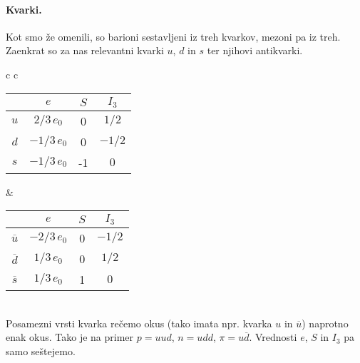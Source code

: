 \documentclass[a4paper]{article}
\begin{document}
\paragraph{Kvarki.} Kot smo že omenili, so barioni sestavljeni iz treh kvarkov, mezoni pa iz treh.
Zaenkrat so za nas relevantni kvarki \(u\), \(d\) in \(s\) ter njihovi antikvarki.
\begin{table}[h!]
    \centering
    \begin{tabular}{c c}
        \begin{tabular}{c|c c c}
            & \(e\) & \(S\) & \(I_3\) \\
            \hline
            \(u\) & \(2/3\,e_0\) & 0 & \(1/2\) \\
            \(d\) & \(-1/3\,e_0\) & 0 & \(-1/2\) \\
            \(s\) & \(-1/3\,e_0\) & -1 & \(0\) \\
        \end{tabular} \hspace{1cm} & \hspace{1cm}
        \begin{tabular}{c|c c c}
            & \(e\) & \(S\) & \(I_3\) \\
            \hline
            \(\overline{u}\) & \(-2/3\,e_0\) & 0 & \(-1/2\) \\
            \(\overline{d}\) & \(1/3\,e_0\) & 0 & \(1/2\) \\
            \(\overline{s}\) & \(1/3\,e_0\) & 1 & \(0\) \\
        \end{tabular}
    \end{tabular}
\end{table} \\
Posamezni vrsti kvarka rečemo okus (tako imata npr. kvarka \(u\) in \(\overline{u}\)) naprotno enak okus.
Tako je na primer \(p = uud\), \(n = udd\), \(\pi = u\overline{d}\). Vrednosti \(e\), \(S\) in \(I_3\) pa samo seštejemo.
\end{document}
